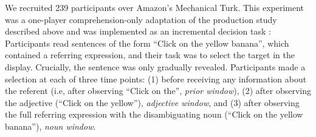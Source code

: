 \documentclass[10pt,letterpaper]{article}
\begin{document}

We recruited 239 participants over Amazon's Mechanical Turk. This experiment was a one-player comprehension-only adaptation of the production study described above and was implemented as an incremental decision task \cite{Qing:2018}: Participants read sentences of the form ``Click on the yellow banana'', which contained a referring expression, and their task was to select the target in the display. Crucially, the sentence was only gradually revealed. Participants made a selection at each of three time points: (1) before receiving any information about the referent (i.e, after observing ``Click on the'', \emph{prior window}), (2) after observing the adjective (``Click on the yellow''), \emph{adjective window}, and (3) after observing the full referring expression with the disambiguating noun (``Click on the yellow banana''), \emph{noun window}. 
\end{document}
